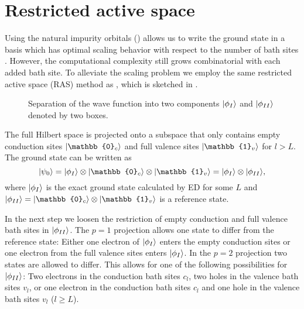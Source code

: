\section{Restricted active space}
\label{sec:ras}


Using the natural impurity orbitals () allows us to
write the ground state in a basis which has optimal scaling behavior with respect to
the number of bath sites \cite{Lu2019}.
However, the computational complexity still grows combinatorial with each added bath site.
To alleviate the scaling problem we employ the same restricted active space (RAS) method
as \citeauthor{Lu2019} \cite{Lu2019}, which is sketched in .

\begin{figure}[ht]
    \centering
    
    \caption{
        Separation of the wave function into two components
        $\lvert\phi_I\rangle$ and $\lvert\phi_{II}\rangle$ denoted by two boxes.
    }
    \label{fig:aim-separation}
\end{figure}

The full Hilbert space is projected onto a subspace that only contains
empty conduction sites $\ket{\mathbb{0}_c}$
and full valence sites $\ket{\mathbb{1}_v}$ for $l>L$.
The ground state can be written as
\begin{equation}
    \ket{\psi_0}
    =
    \ket{\phi_I} \otimes \ket{\mathbb{0}_c} \otimes \ket{\mathbb{1}_v}
    =
    \ket{\phi_I} \otimes \ket{\phi_{II}},
\end{equation}
where $\lvert\phi_I\rangle$ is the exact ground state calculated by ED for some $L$
and $\ket{\phi_{II}} = \ket{\mathbb{0}_c} \otimes \ket{\mathbb{1}_v}$ is a reference state.

In the next step we loosen the restriction of empty conduction and full valence bath sites
in $\lvert\phi_{II}\rangle$.
The $p=1$ projection allows one state to differ from the reference state:
Either one electron of $\lvert\phi_I\rangle$ enters the empty conduction sites
or one electron from the full valence sites enters $\lvert\phi_I\rangle$.
In the $p=2$ projection two states are allowed to differ.
This allows for one of the following possibilities for $\lvert\phi_{II}\rangle$:
Two electrons in the conduction bath sites $c_l$,
two holes in the valence bath sites $v_l$,
or one electron in the conduction bath sites $c_l$
and one hole in the valence bath sites $v_l$ ($l\ge L$).

